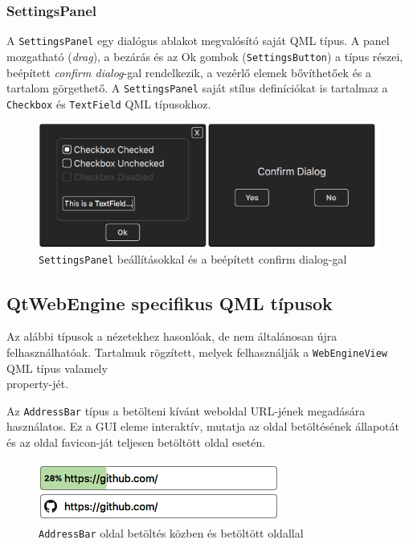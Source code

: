 \documentclass[12pt]{report}
\begin{document}
\subsubsection{SettingsPanel}
A \texttt{SettingsPanel} egy dialógus ablakot megvalósító saját QML típus. A panel
mozgatható (\textit{drag}), a bezárás és az Ok gombok (\texttt{SettingsButton}) a típus
részei, beépített \textit{confirm dialog}-gal rendelkezik, a vezérlő elemek bővíthetőek
és a tartalom görgethető. A \texttt{SettingsPanel} saját stílus definíciókat is tartalmaz
a \texttt{Checkbox} és \texttt{TextField} QML típusokhoz.

\begin{figure}[H]
    \centering
    \includegraphics[scale=0.7]{SettingsPanel}
    \caption{
        \label{fig:settings-panel}
        \texttt{SettingsPanel} beállításokkal és a beépített confirm dialog-gal
    }
\end{figure}

\subsection{QtWebEngine specifikus QML típusok}
Az alábbi típusok a nézetekhez hasonlóak, de nem általánosan újra felhasználhatóak.
Tartalmuk rögzített, melyek felhasználják a \texttt{WebEngineView} QML típus valamely \\
property-jét.

Az \texttt{AddressBar} típus a betölteni kívánt weboldal URL-jének megadására használatos.
Ez a GUI eleme interaktív, mutatja az oldal betöltésének állapotát és az oldal favicon-ját
teljesen betöltött oldal esetén.
\begin{figure}[H]
    \centering
    \includegraphics[scale=0.8]{AddressBar}
    \caption{
        \label{fig:address-bar}
        \texttt{AddressBar} oldal betöltés közben és betöltött oldallal
    }
\end{figure}
\end{document}
